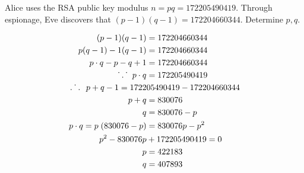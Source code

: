 \begin{problem}
Alice uses the RSA public key modulus $n=pq=172205490419$.
Through espionage, Eve discovers that $(p-1)(q-1)=172204660344$.  Determine $p,q$.
\end{problem}

\begin{Answer}
  \begin{multicols*}{2}
    \begin{align*}
      (p-1)(q-1) &= 172204660344 \\
      p(q-1) - 1(q-1) &= 172204660344 \\
      p \cdot q - p - q + 1 &= 172204660344 \\
      \dot{}\hspace{.045in}.\hspace{.045in} \dot{}\hspace{.095in} p \cdot q &= 172205490419 \\
      \dot{.\hspace{.095in}.}\hspace{.095in} p + q - 1 = 1722&05490419 - 172204660344 \\
      p + q &= 830076 \\
      q &= 830076 - p \\
      p \cdot q = p \;(830076 - p) &= 830076p - p^2 \\
      p^2 - 830076p &+ 172205490419 = 0 \\
      p &= 422183\\
      q &= 407893
    \end{align*}

  \end{multicols*}
\end{Answer}
